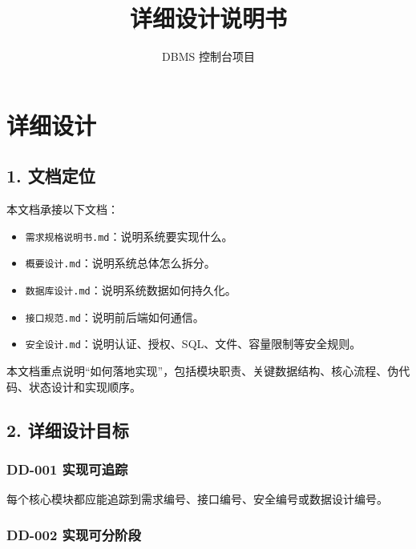 \documentclass[
  a4paper,
  UTF8]{ctexart}
\title{详细设计说明书}
\author{DBMS 控制台项目}
\date{}
\providecommand{\tightlist}{%
  \setlength{\itemsep}{0pt}\setlength{\parskip}{0pt}}
\begin{document}
\maketitle

\renewcommand*\contentsname{目录}
{
\hypersetup{linkcolor=}
\setcounter{tocdepth}{3}
\tableofcontents
}
\hypertarget{ux8be6ux7ec6ux8bbeux8ba1}{%
\section{详细设计}\label{ux8be6ux7ec6ux8bbeux8ba1}}

\hypertarget{ux6587ux6863ux5b9aux4f4d}{%
\subsection{1. 文档定位}\label{ux6587ux6863ux5b9aux4f4d}}

本文档承接以下文档：

\begin{itemize}
\tightlist
\item
  \texttt{需求规格说明书.md}：说明系统要实现什么。
\item
  \texttt{概要设计.md}：说明系统总体怎么拆分。
\item
  \texttt{数据库设计.md}：说明系统数据如何持久化。
\item
  \texttt{接口规范.md}：说明前后端如何通信。
\item
  \texttt{安全设计.md}：说明认证、授权、SQL、文件、容量限制等安全规则。
\end{itemize}

本文档重点说明``如何落地实现''，包括模块职责、关键数据结构、核心流程、伪代码、状态设计和实现顺序。

\hypertarget{ux8be6ux7ec6ux8bbeux8ba1ux76eeux6807}{%
\subsection{2.
详细设计目标}\label{ux8be6ux7ec6ux8bbeux8ba1ux76eeux6807}}

\hypertarget{dd-001-ux5b9eux73b0ux53efux8ffdux8e2a}{%
\subsubsection{DD-001
实现可追踪}\label{dd-001-ux5b9eux73b0ux53efux8ffdux8e2a}}

每个核心模块都应能追踪到需求编号、接口编号、安全编号或数据设计编号。

\hypertarget{dd-002-ux5b9eux73b0ux53efux5206ux9636ux6bb5}{%
\subsubsection{DD-002
实现可分阶段}\label{dd-002-ux5b9eux73b0ux53efux5206ux9636ux6bb5}}
\end{document}
